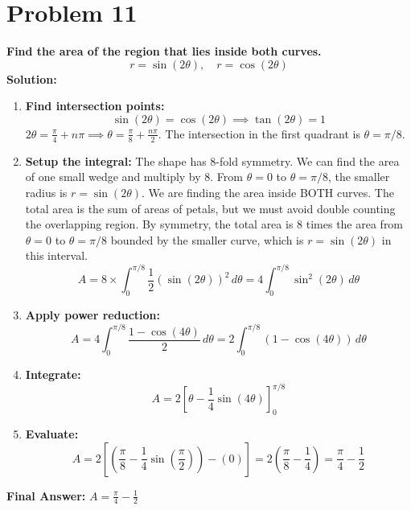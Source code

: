 \documentclass{article}
\begin{document}
\section*{Problem 11}
\textbf{Find the area of the region that lies inside both curves.}
\[ r = \sin(2\theta), \quad r = \cos(2\theta) \]
\textbf{Solution:}
\begin{enumerate}
    \item \textbf{Find intersection points:}
    \[ \sin(2\theta) = \cos(2\theta) \implies \tan(2\theta) = 1 \]
    $2\theta = \frac{\pi}{4} + n\pi \implies \theta = \frac{\pi}{8} + \frac{n\pi}{2}$. The intersection in the first quadrant is $\theta=\pi/8$.
    \item \textbf{Setup the integral:} The shape has 8-fold symmetry. We can find the area of one small wedge and multiply by 8. From $\theta=0$ to $\theta=\pi/8$, the smaller radius is $r=\sin(2\theta)$. We are finding the area inside BOTH curves.
    The total area is the sum of areas of petals, but we must avoid double counting the overlapping region.
    By symmetry, the total area is 8 times the area from $\theta=0$ to $\theta=\pi/8$ bounded by the smaller curve, which is $r=\sin(2\theta)$ in this interval.
    \[ A = 8 \times \int_{0}^{\pi/8} \frac{1}{2} (\sin(2\theta))^2 \,d\theta = 4 \int_{0}^{\pi/8} \sin^2(2\theta) \,d\theta \]
    \item \textbf{Apply power reduction:}
    \[ A = 4 \int_{0}^{\pi/8} \frac{1-\cos(4\theta)}{2} \,d\theta = 2 \int_{0}^{\pi/8} (1-\cos(4\theta)) \,d\theta \]
    \item \textbf{Integrate:}
    \[ A = 2 \left[ \theta - \frac{1}{4}\sin(4\theta) \right]_{0}^{\pi/8} \]
    \item \textbf{Evaluate:}
    \[ A = 2 \left[ (\frac{\pi}{8} - \frac{1}{4}\sin(\frac{\pi}{2})) - (0) \right] = 2 \left( \frac{\pi}{8} - \frac{1}{4} \right) = \frac{\pi}{4} - \frac{1}{2} \]
\end{enumerate}
\textbf{Final Answer:} $A = \frac{\pi}{4} - \frac{1}{2}$
\newpage
\end{document}
